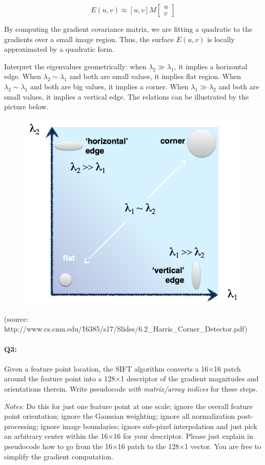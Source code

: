 \begin{equation*}
    E(u, v) \approx [u, v] M \begin{bmatrix}
        u \\ v
    \end{bmatrix}
\end{equation*}

By computing the gradient covariance matrix, we are fitting a quadratic to the gradients over a small image region. Thus, the surface $E(u, v)$ is locally approximated by a quadratic form. 

Interpret the eigenvalues geometrically: when $\lambda_2 \gg \lambda_1$, it implies a horizontal edge. When $\lambda_2 \sim \lambda_1$ and both are small values, it implies flat region. When $\lambda_2 \sim \lambda_1$ and both are big values, it implies a corner. When $\lambda_1 \gg \lambda_2$ and both are small values, it implies a vertical edge. The relations can be illustrated by the picture below.

\begin{figure}[htbp]
    \centering
    \includegraphics[width=0.5\linewidth]{eig_M_explaination.png}    
\end{figure}

(source: http://www.cs.cmu.edu/\~16385/s17/Slides/6.2\_Harris\_Corner\_Detector.pdf)


\pagebreak
\paragraph{Q3:} Given a feature point location, the SIFT algorithm converts a 16$\times$16 patch around the feature point into a 128$\times$1 descriptor of the gradient magnitudes and orientations therein. Write pseudocode \emph{with matrix/array indices} for these steps.

\emph{Notes:} Do this for just one feature point at one scale; ignore the overall feature point orientation; ignore the Gaussian weighting; ignore all normalization post-processing; ignore image boundaries; ignore sub-pixel interpolation and just pick an arbitrary center within the 16$\times$16 for your descriptor. Please just explain in pseudocode how to go from the 16$\times$16 patch to the 128$\times$1 vector. You are free to simplify the gradient computation.

